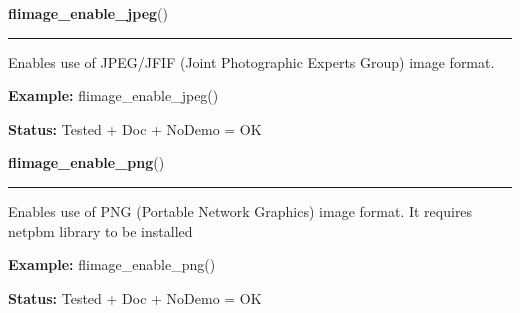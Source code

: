 \hspace{.8\funcindent}\begin{boxedminipage}{\funcwidth}

    \raggedright \textbf{flimage\_enable\_jpeg}()

    \vspace{-1.5ex}

    \rule{\textwidth}{0.5\fboxrule}
\setlength{\parskip}{2ex}
    Enables use of JPEG/JFIF (Joint Photographic Experts Group) image 
    format.

\setlength{\parskip}{1ex}
\textbf{Example:} flimage\_enable\_jpeg()



\textbf{Status:} Tested + Doc + NoDemo = OK



    \end{boxedminipage}

    \label{xformslib:flflimage:flimage_enable_png}

    \vspace{0.5ex}

\hspace{.8\funcindent}\begin{boxedminipage}{\funcwidth}

    \raggedright \textbf{flimage\_enable\_png}()

    \vspace{-1.5ex}

    \rule{\textwidth}{0.5\fboxrule}
\setlength{\parskip}{2ex}
    Enables use of PNG (Portable Network Graphics) image format. It 
    requires netpbm library to be installed

\setlength{\parskip}{1ex}
\textbf{Example:} flimage\_enable\_png()



\textbf{Status:} Tested + Doc + NoDemo = OK



    \end{boxedminipage}

    \label{xformslib:flflimage:flimage_enable_ps}

    \vspace{0.5ex}

